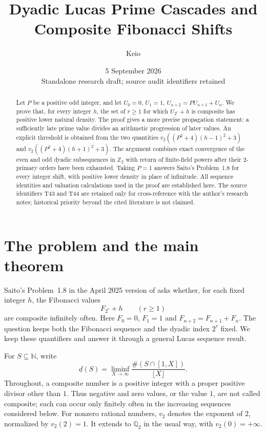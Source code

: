 \documentclass[11pt,a4paper]{article}
\author{Keio}
\date{5 September 2026\\\small Standalone research draft; source audit identifiers retained}
\title{Dyadic Lucas Prime Cascades and\\ Composite Fibonacci Shifts}
\theoremstyle{definition}\newtheorem{definition}[theorem]{Definition}
\theoremstyle{remark}\newtheorem{remark}[theorem]{Remark}
\newcommand{\Q}{\mathbb Q}\newcommand{\Z}{\mathbb Z}\newcommand{\N}{\mathbb N}\newcommand{\R}{\mathbb R}\newcommand{\C}{\mathbb C}
\begin{document}
\maketitle
\begin{abstract}
Let $P$ be a positive odd integer, and let $U_0=0$, $U_1=1$,
$U_{n+2}=PU_{n+1}+U_n$. We prove that, for every integer $h$, the
set of $r\ge1$ for which $U_{2^r}+h$ is composite has positive lower
natural density. The proof gives a more precise propagation statement:
a sufficiently late prime value divides an arithmetic progression of
later values. An explicit threshold is obtained from the two quantities
$v_2((P^2+4)(h-1)^2+3)$ and $v_2((P^2+4)(h+1)^2+3)$.
The argument combines exact convergence of the even and odd dyadic
subsequences in $\Z_2$ with return of finite-field powers after their
2-primary orders have been exhausted. Taking $P=1$ answers Saito's
Problem~1.8 for every integer shift, with positive lower density in place
of infinitude. All sequence identities and valuation calculations used
in the proof are established here. The source identifiers T43 and T44
are retained only for cross-reference with the author's research notes;
historical priority beyond the cited literature is not claimed.
\end{abstract}

\section{The problem and the main theorem}
Saito's Problem~1.8 in the April 2025 version of
\cite{SaitoIntervals} asks whether, for each fixed integer $h$, the
Fibonacci values
\begin{equation}\label{eq:question}
 F_{2^r}+h\qquad(r\ge1)
\end{equation}
are composite infinitely often. Here $F_0=0$, $F_1=1$ and
$F_{n+2}=F_{n+1}+F_n$. The question keeps both the Fibonacci sequence
and the dyadic index $2^r$ fixed. We keep these quantifiers and answer
it through a general Lucas sequence result.

For $S\subseteq\N$, write
\[
 \underline d(S)=\liminf_{X\to\infty}
 \frac{\#(S\cap[1,X])}{\lfloor X\rfloor}.
\]
Throughout, a composite number is a positive integer with a proper
positive divisor other than $1$. Thus negative and zero values, or the
value $1$, are not called composite; each can occur only finitely often
in the increasing sequences considered below. For nonzero rational
numbers, $v_2$ denotes the exponent of $2$, normalized by $v_2(2)=1$.
It extends to $\Q_2$ in the usual way, with $v_2(0)=+\infty$.
\end{document}
